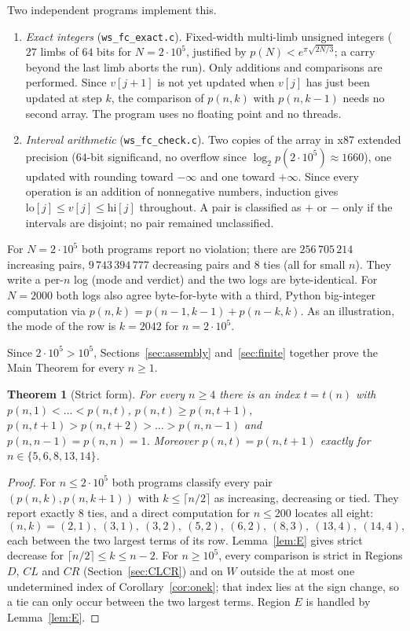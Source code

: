 \documentclass[11pt]{amsart}
\newcommand{\script}[1]{\texttt{#1}}
\newtheorem{theorem}{Theorem}[section]
\theoremstyle{definition}
\theoremstyle{remark}
\numberwithin{equation}{section}
\begin{document}
Two independent programs implement this.
\begin{enumerate}
\item \emph{Exact integers} (\script{ws\_fc\_exact.c}). Fixed-width multi-limb unsigned integers ($27$ limbs of $64$ bits for $N=2\cdot10^5$,
  justified by $p(N)<e^{\pi\sqrt{2N/3}}$; a carry beyond the last limb aborts the run). Only additions and comparisons are performed.
  Since $v[j+1]$ is not yet updated when $v[j]$ has just been updated at step $k$, the comparison of $p(n,k)$ with $p(n,k-1)$ needs no
  second array. The program uses no floating point and no threads.
\item \emph{Interval arithmetic} (\script{ws\_fc\_check.c}). Two copies of the array in x87 extended precision ($64$-bit significand,
  no overflow since $\log_2p(2\cdot10^5)\approx1660$), one updated with rounding toward $-\infty$ and one toward $+\infty$. Since every
  operation is an addition of nonnegative numbers, induction gives $\mathrm{lo}[j]\le v[j]\le\mathrm{hi}[j]$ throughout. A pair is classified
  as $+$ or $-$ only if the intervals are disjoint; no pair remained unclassified.
\end{enumerate}
For $N=2\cdot10^5$ both programs report no violation; there are $256\,705\,214$ increasing pairs, $9\,743\,394\,777$ decreasing pairs and $8$
ties (all for small $n$). They write a per-$n$ log (mode and verdict) and the two logs are byte-identical. For $N=2000$ both logs also agree
byte-for-byte with a third, Python big-integer computation via $p(n,k)=p(n-1,k-1)+p(n-k,k)$. As an illustration, the mode of the row is
$k=2042$ for $n=2\cdot10^5$.

Since $2\cdot10^5>10^5$, Sections~\ref{sec:assembly} and~\ref{sec:finite} together prove the Main Theorem for every $n\ge1$.

\begin{theorem}[Strict form]\label{thm:strict}
For every $n\ge4$ there is an index $t=t(n)$ with
$p(n,1)<\dots<p(n,t)$, $p(n,t)\ge p(n,t+1)$, $p(n,t+1)>p(n,t+2)>\dots>p(n,n-1)$ and $p(n,n-1)=p(n,n)=1$.
Moreover $p(n,t)=p(n,t+1)$ exactly for $n\in\{5,6,8,13,14\}$.
\end{theorem}

\begin{proof}
For $n\le2\cdot10^5$ both programs classify every pair $(p(n,k),p(n,k+1))$ with $k\le\lceil n/2\rceil$ as increasing, decreasing or tied.
They report exactly $8$ ties, and a direct computation for $n\le200$ locates all eight:
\[
(n,k)=(2,1),\ (3,1),\ (3,2),\ (5,2),\ (6,2),\ (8,3),\ (13,4),\ (14,4),
\]
each between the two largest terms of its row. Lemma~\ref{lem:E}
gives strict decrease for $\lceil n/2\rceil\le k\le n-2$. For $n\ge10^5$, every comparison is strict in Regions $D$, $CL$ and $CR$
(Section~\ref{sec:CLCR}) and on $W$ outside the at most one undetermined index of Corollary~\ref{cor:onek}; that index lies at
the sign change, so a tie can only occur between the two largest terms. Region $E$ is handled by Lemma~\ref{lem:E}.
\end{proof}
\end{document}
